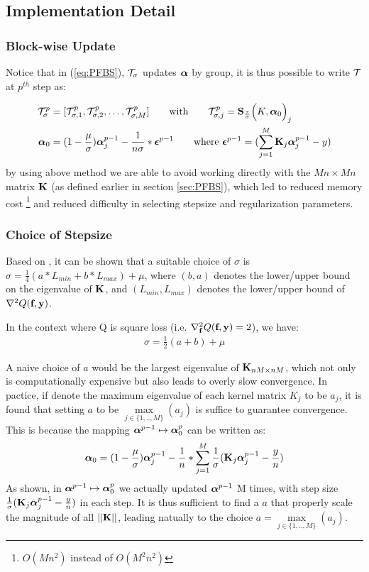 \documentclass[tablecaption=bottom,wcp]{jmlr} %
\begin{document}
\subsection{Implementation Detail}

\subsubsection{Block-wise Update}

Notice that in (\ref{eq:PFBS}), ${\cal T}_\sigma$ updates $\boldsymbol{\alpha}$ by group, it is thus possible to write ${\cal T}$ at $p^{th}$ step as:

\begin{align*}
{\cal T}^p_\sigma &= [{\cal T}^p_{\sigma, 1}, {\cal T}^p_{\sigma, 2}, \dots, {\cal T}^p_{\sigma, M}] 
\qquad \mbox{with} \qquad
{\cal T}^p_{\sigma, j} = 
\textbf{S}_{\frac{\tau}{\sigma}}
\Big(K, \boldsymbol{\alpha}_0 \Big)_j \\
\boldsymbol{\alpha}_0 &= 
(1-\frac{\mu}{\sigma})\boldsymbol{\alpha}^{p-1}_j - 
\frac{1}{n \sigma} * \boldsymbol{\epsilon}^{p-1}  
\qquad \mbox{where } 
\boldsymbol{\epsilon}^{p-1}= (\sum_{j=1}^M {\bf K}_j \boldsymbol{\alpha}^{p-1}_j - y)
\end{align*}
by using above method we are able to avoid working directly with the $Mn \times Mn$ matrix ${\bf K}$ (as defined earlier in section \ref{sec:PFBS}), which led to reduced memory cost \footnote{$O(Mn^2)$ instead of $O(M^2n^2)$} and reduced difficulty in selecting stepsize and regularization parameters.

\subsubsection{Choice of Stepsize}

Based on \citet{jordan-mkl-2004}, it can be shown that a suitable choice of $\sigma$ is $\sigma = \frac{1}{4}(a*L_{min} + b*L_{max}) + \mu$, where $(b, a)$ denotes the lower/upper bound on the eigenvalue of ${\bf K}$, and $(L_{min}, L_{max})$ denotes the lower/upper bound of $\nabla^2 Q(\textbf{f}, {\bf y})$.

In the context where  Q is square loss (i.e. $\nabla^2_{\textbf{f}} Q(\textbf{f}, {\bf y}) = 2$), we have:
\begin{align*}
\sigma = \frac{1}{2}(a + b) + \mu
\end{align*}

A naive choice of $a$ would be the largest eigenvalue of ${\bf K}_{nM \times nM}$, which not only is computationally expensive but also leads to overly slow convergence. In pactice, if denote the maximum eigenvalue of each kernel matrix $K_j$ to be $a_j$, it is found that setting $a$ to be $\underset{j \in \{1, .., M\}}{\max} (a_j)$ is suffice to guarantee convergence.  This is because the mapping $\boldsymbol{\alpha}^{p-1} \mapsto \boldsymbol{\alpha}_0^{p}$ can be written as:
$$
\boldsymbol{\alpha}_0 = 
(1-\frac{\mu}{\sigma})\boldsymbol{\alpha}^{p-1}_j - 
\frac{1}{n} * \sum_{j=1}^M \frac{1}{\sigma}
({\bf K}_j \boldsymbol{\alpha}^{p-1}_j - \frac{y}{n})
$$
As shown, in $\boldsymbol{\alpha}^{p-1} \mapsto \boldsymbol{\alpha}_0^{p}$ we actually updated $\boldsymbol{\alpha}^{p-1}$ M times, with step size $\frac{1}{\sigma}({\bf K}_j \boldsymbol{\alpha}^{p-1}_j - \frac{y}{n})$ in each step. It is thus sufficient to find a $a$ that properly scale the magnitude of all $||{\bf K}||$, leading natually to the choice $a = \underset{j \in \{1, .., M\}}{\max} (a_j)$.
\end{document}
